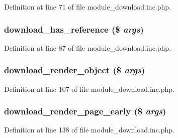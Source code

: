Definition at line 71 of file module\_\-download.inc.php.

\hypertarget{module__download_8inc_8php_aa80da3f3fd41f7f00f97043f7a2431c8}{
\subsubsection[{download\_\-has\_\-reference}]{\setlength{\rightskip}{0pt plus 5cm}download\_\-has\_\-reference (\$ {\em args})}}
\label{module__download_8inc_8php_aa80da3f3fd41f7f00f97043f7a2431c8}


Definition at line 87 of file module\_\-download.inc.php.

\hypertarget{module__download_8inc_8php_a57c588f1fd0663aa16fd707a522bcc79}{
\subsubsection[{download\_\-render\_\-object}]{\setlength{\rightskip}{0pt plus 5cm}download\_\-render\_\-object (\$ {\em args})}}
\label{module__download_8inc_8php_a57c588f1fd0663aa16fd707a522bcc79}


Definition at line 107 of file module\_\-download.inc.php.

\hypertarget{module__download_8inc_8php_ac980246bec838c65efd59bc25253b005}{
\subsubsection[{download\_\-render\_\-page\_\-early}]{\setlength{\rightskip}{0pt plus 5cm}download\_\-render\_\-page\_\-early (\$ {\em args})}}
\label{module__download_8inc_8php_ac980246bec838c65efd59bc25253b005}


Definition at line 138 of file module\_\-download.inc.php.

